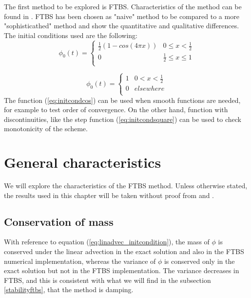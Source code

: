 

The first method to be explored is FTBS. Characteristics of the method can be found in \cite{mpebook}.
FTBS has been chosen as "naive" method to be compared to a more "sophisticathed" method and show the quantitative and qualitative differences.
The initial conditions used are the following:
\begin{equation}
\phi_0(t)=\left\{
\begin{array}{lr}
\frac{1}{2}(1-cos(4\pi x)) & 0\leq x<\frac{1}{2} \\
0 &  \frac{1}{2}\leq x\leq 1 \\
\end{array}
\right.
\label{eq:initcondcos}
\end{equation}

\begin{equation}
\phi_0(t)=\left\{
\begin{array}{lr}
1 & 0<x<\frac{1}{2} \\
0 &  elsewhere \\
\end{array}
\right.
\label{eq:initcondsquare}
\end{equation}
The function (\ref{eq:initcondcos}) can be used when smooth functions are needed, for example to test order of convergence. On the other hand, function with discontinuities, like the step function (\ref{eq:initcondsquare}) can be used to check monotonicity of the scheme.

\section{General characteristics}
We will explore the characteristics of the FTBS method. Unless otherwise stated, the results used in this chapter will be taken without proof from \cite{mpebook} and \cite{nmnotes}. 

\subsection{Conservation of mass} \label{conservationftbs}
With reference to equation (\ref{eq:linadvec_initcondition}), the mass of $\phi$ is conserved under the linear advection in the exact solution and also in the FTBS numerical implementation, whereas the variance of $\phi$ is conserved only in the exact solution but not in the FTBS implementation. The variance decreases in FTBS, and this is consistent with what we will find in the subsection \ref{stabilityftbs}, that the method is damping.

